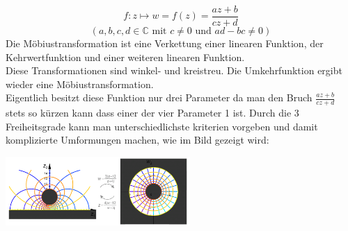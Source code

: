 	\begin{minipage}{10cm}
		$$ f : z \mapsto w = f(z) = \frac{az + b}{cz + d}$$
		$$(a, b, c, d \in 
		\mathbb{C} \text{ mit } c \neq 0 \text{ und } ad - bc \neq 0) $$
		Die Möbiustransformation ist eine Verkettung einer linearen Funktion, der Kehrwertfunktion und einer weiteren linearen Funktion. \\
		Diese Transformationen sind winkel- und kreistreu. Die Umkehrfunktion ergibt wieder eine Möbiustransformation. \\
		Eigentlich besitzt diese Funktion nur drei Parameter da man den Bruch
		$\frac{az + b}{cz + d}$ stets so kürzen kann dass einer der vier Parameter 1
		ist. Durch die 3 Freiheitsgrade kann man unterschiedlichste kriterien
		vorgeben und damit komplizierte Umformungen machen, wie im Bild gezeigt wird:
	
	\end{minipage}
	\hspace{2cm}
	\begin{minipage}{7cm}
		\includegraphics[width=7cm]{./bilder/Moebiustransformation.png} 
	\end{minipage}

